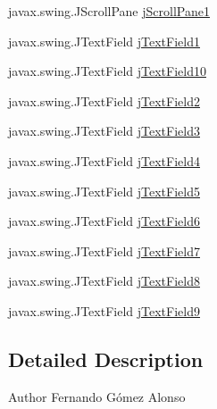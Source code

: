 \begin{DoxyCompactItemize}
\item 
javax.\+swing.\+J\+Scroll\+Pane \mbox{\hyperlink{class_interfaz_package_1_1_alta_diccionario_a0b33f28ce4ff536b4ef1fa9b546c8ae4}{j\+Scroll\+Pane1}}
\item 
javax.\+swing.\+J\+Text\+Field \mbox{\hyperlink{class_interfaz_package_1_1_alta_diccionario_a36c60a7c341675a6d9588408d4babd4c}{j\+Text\+Field1}}
\item 
javax.\+swing.\+J\+Text\+Field \mbox{\hyperlink{class_interfaz_package_1_1_alta_diccionario_a4fb32d82093d4c678abb7a5130e2cf23}{j\+Text\+Field10}}
\item 
javax.\+swing.\+J\+Text\+Field \mbox{\hyperlink{class_interfaz_package_1_1_alta_diccionario_ad64c1145064a7b09a9bc29cf43974b70}{j\+Text\+Field2}}
\item 
javax.\+swing.\+J\+Text\+Field \mbox{\hyperlink{class_interfaz_package_1_1_alta_diccionario_aae93f196d81a8be5120cd2e4a3968176}{j\+Text\+Field3}}
\item 
javax.\+swing.\+J\+Text\+Field \mbox{\hyperlink{class_interfaz_package_1_1_alta_diccionario_a66e68fc19055b7af4fcac12091ab7c45}{j\+Text\+Field4}}
\item 
javax.\+swing.\+J\+Text\+Field \mbox{\hyperlink{class_interfaz_package_1_1_alta_diccionario_a56756a5f37a4a3056ce24d5570b99d61}{j\+Text\+Field5}}
\item 
javax.\+swing.\+J\+Text\+Field \mbox{\hyperlink{class_interfaz_package_1_1_alta_diccionario_af4d8c6da79f9c1a9c5d4d8b9f70935c0}{j\+Text\+Field6}}
\item 
javax.\+swing.\+J\+Text\+Field \mbox{\hyperlink{class_interfaz_package_1_1_alta_diccionario_a21d52c5fe53e1a05874c6771dc828a1d}{j\+Text\+Field7}}
\item 
javax.\+swing.\+J\+Text\+Field \mbox{\hyperlink{class_interfaz_package_1_1_alta_diccionario_a3e91b2eb94fa14f68ad137f48e0500f6}{j\+Text\+Field8}}
\item 
javax.\+swing.\+J\+Text\+Field \mbox{\hyperlink{class_interfaz_package_1_1_alta_diccionario_a06c739f8e895e3be23782b6220a1bd91}{j\+Text\+Field9}}
\end{DoxyCompactItemize}


\subsection{Detailed Description}
\begin{DoxyAuthor}{Author}
Fernando Gómez Alonso 
\end{DoxyAuthor}


